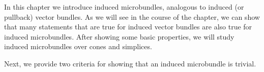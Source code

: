 \begin{myparagraph}
    In this chapter we introduce induced microbundles,
    analogous to induced (or pullback) vector bundles.
    As we will see in the course of the chapter,
    we can show that many statements that are true for
    induced vector bundles are also true for induced microbundles.
    After showing some basic properties,
    we will study induced microbundles over cones and simplices.
\end{myparagraph}


\begin{myparagraph}
    Next, we provide two criteria for showing that an induced microbundle is trivial.
\end{myparagraph}




